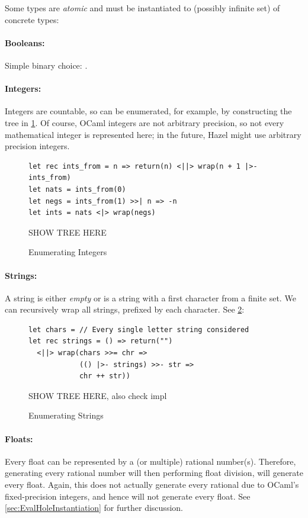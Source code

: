 Some types are \textit{atomic} and must be instantiated to (possibly infinite set) of concrete types:

\paragraph{Booleans:} Simple binary choice: .
\paragraph{Integers:} Integers are countable, so can be enumerated, for example, by constructing the tree in \cref{fig:Integers}. Of course, OCaml integers are not arbitrary precision, so not every mathematical integer is represented here; in the future, Hazel might use arbitrary precision integers.
\begin{figure}[h]
\begin{verbatim}
let rec ints_from = n => return(n) <||> wrap(n + 1 |>- ints_from)
let nats = ints_from(0)
let negs = ints_from(1) >>| n => -n
let ints = nats <|> wrap(negs) 
\end{verbatim}
SHOW TREE HERE
\caption{Enumerating Integers}
\label{fig:Integers}
\end{figure}
 
\paragraph{Strings:} A string is either \textit{empty} or is a string with a first character from a finite set. We can recursively wrap all strings, prefixed by each character. See \cref{fig:Strings}:
\begin{figure}[h]
\begin{verbatim}
let chars = // Every single letter string considered
let rec strings = () => return("") 
  <||> wrap(chars >>= chr => 
            (() |>- strings) >>- str => 
            chr ++ str)) 
\end{verbatim}
SHOW TREE HERE, also check impl
\caption{Enumerating Strings}
\label{fig:Strings}
\end{figure}

\paragraph{Floats:} Every float can be represented by a (or multiple) rational number(s). Therefore, generating every rational number will then performing float division, will generate every float. Again, this does not actually generate every rational due to OCaml's fixed-precision integers, and hence will not generate every float. See \cref{sec:EvalHoleInstantiation} for further discussion.
 \\
 
